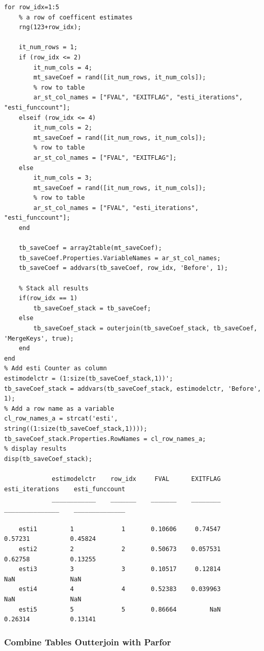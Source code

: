 \documentclass[
]{book}
\begin{document}
\begin{verbatim}
for row_idx=1:5
    % a row of coefficent estimates
    rng(123+row_idx);
    
    it_num_rows = 1;
    if (row_idx <= 2) 
        it_num_cols = 4;
        mt_saveCoef = rand([it_num_rows, it_num_cols]);    
        % row to table    
        ar_st_col_names = ["FVAL", "EXITFLAG", "esti_iterations", "esti_funccount"];
    elseif (row_idx <= 4) 
        it_num_cols = 2;
        mt_saveCoef = rand([it_num_rows, it_num_cols]);
        % row to table    
        ar_st_col_names = ["FVAL", "EXITFLAG"];
    else
        it_num_cols = 3;
        mt_saveCoef = rand([it_num_rows, it_num_cols]);
        % row to table    
        ar_st_col_names = ["FVAL", "esti_iterations", "esti_funccount"];
    end
    
    tb_saveCoef = array2table(mt_saveCoef);
    tb_saveCoef.Properties.VariableNames = ar_st_col_names;
    tb_saveCoef = addvars(tb_saveCoef, row_idx, 'Before', 1);
    
    % Stack all results
    if(row_idx == 1)
        tb_saveCoef_stack = tb_saveCoef;
    else
        tb_saveCoef_stack = outerjoin(tb_saveCoef_stack, tb_saveCoef, 'MergeKeys', true);
    end
end
% Add esti Counter as column
estimodelctr = (1:size(tb_saveCoef_stack,1))';
tb_saveCoef_stack = addvars(tb_saveCoef_stack, estimodelctr, 'Before', 1);
% Add a row name as a variable
cl_row_names_a = strcat('esti', string((1:size(tb_saveCoef_stack,1))));
tb_saveCoef_stack.Properties.RowNames = cl_row_names_a;
% display results
disp(tb_saveCoef_stack);

             estimodelctr    row_idx     FVAL      EXITFLAG    esti_iterations    esti_funccount
             ____________    _______    _______    ________    _______________    ______________

    esti1         1             1       0.10606     0.74547        0.57231           0.45824    
    esti2         2             2       0.50673    0.057531        0.62758           0.13255    
    esti3         3             3       0.10517     0.12814            NaN               NaN    
    esti4         4             4       0.52383    0.039963            NaN               NaN    
    esti5         5             5       0.86664         NaN        0.26314           0.13141    
\end{verbatim}

\hypertarget{combine-tables-outterjoin-with-parfor}{%
\subsubsection{Combine Tables Outterjoin with Parfor}\label{combine-tables-outterjoin-with-parfor}}
\end{document}
